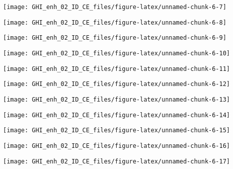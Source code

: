 \documentclass[
  10pt,
  a4paper,oneside]{article}
\begin{document}
\begin{center}\texttt{[image: GHI\_enh\_02\_ID\_CE\_files/figure-latex/unnamed-chunk-6-7]} \end{center}

\begin{center}\texttt{[image: GHI\_enh\_02\_ID\_CE\_files/figure-latex/unnamed-chunk-6-8]} \end{center}

\begin{center}\texttt{[image: GHI\_enh\_02\_ID\_CE\_files/figure-latex/unnamed-chunk-6-9]} \end{center}

\begin{center}\texttt{[image: GHI\_enh\_02\_ID\_CE\_files/figure-latex/unnamed-chunk-6-10]} \end{center}

\begin{center}\texttt{[image: GHI\_enh\_02\_ID\_CE\_files/figure-latex/unnamed-chunk-6-11]} \end{center}

\begin{center}\texttt{[image: GHI\_enh\_02\_ID\_CE\_files/figure-latex/unnamed-chunk-6-12]} \end{center}

\begin{center}\texttt{[image: GHI\_enh\_02\_ID\_CE\_files/figure-latex/unnamed-chunk-6-13]} \end{center}

\begin{center}\texttt{[image: GHI\_enh\_02\_ID\_CE\_files/figure-latex/unnamed-chunk-6-14]} \end{center}

\begin{center}\texttt{[image: GHI\_enh\_02\_ID\_CE\_files/figure-latex/unnamed-chunk-6-15]} \end{center}

\begin{center}\texttt{[image: GHI\_enh\_02\_ID\_CE\_files/figure-latex/unnamed-chunk-6-16]} \end{center}

\begin{center}\texttt{[image: GHI\_enh\_02\_ID\_CE\_files/figure-latex/unnamed-chunk-6-17]} \end{center}
\end{document}
